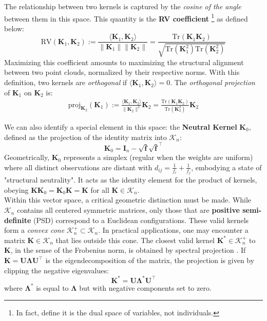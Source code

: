 \documentclass[11pt]{article}
\begin{document}
	The relationship between two kernels is captured by the \emph{cosine of the angle} between them in this space. This quantity is the \textbf{RV coefficient} \citep{robert_unifying_1976}\footnote{In fact,  \citep{robert_unifying_1976} define it is the dual space of variables, not individuals.} as defined below:
	\begin{equation} \label{rv_coeff}
		\text{RV}(\mathbf{K}_1, \mathbf{K}_2) := \frac{\langle \mathbf{K}_1, \mathbf{K}_2 \rangle}{\| \mathbf{K}_1 \| \| \mathbf{K}_2 \|} = \frac{\text{Tr}(\mathbf{K}_1 \mathbf{K}_2)}{\sqrt{\text{Tr}(\mathbf{K}_1^2)\text{Tr}(\mathbf{K}_2^2)}}
	\end{equation}
	Maximizing this coefficient amounts to maximizing the structural alignment between two point clouds, normalized by their respective norms.
	With this definition, two kernels are \emph{orthogonal} if $\langle \mathbf{K}_1, \mathbf{K}_2 \rangle = 0$. The \emph{orthogonal projection} of $\mathbf{K}_1$ on $\mathbf{K}_2$ is:
	\begin{align}
		\text{proj}_{\mathbf{K}_2} (\mathbf{K}_1) := \frac{\langle \mathbf{K}_1, \mathbf{K}_2 \rangle}{\| \mathbf{K}_2 \|^2} \mathbf{K}_2 = \frac{\text{Tr}(\mathbf{K}_1 \mathbf{K}_2)}{\text{Tr}(\mathbf{K}_2^2)} \mathbf{K}_2
	\end{align}
	
	We can also identify a special element in this space: the \textbf{Neutral Kernel} $\mathbf{K}_0$, defined as the projection of the identity matrix into $\mathcal{K}_n$:
	\begin{equation}
		\mathbf{K}_0 = \mathbf{I}_n - \sqrt{\mathbf{f}}\sqrt{\mathbf{f}}^\top
	\end{equation}
	Geometrically, $\mathbf{K}_0$ represents a simplex (regular when the weights are uniform) where all distinct observations are distant with $d_{ij} = \tfrac{1}{f_i} +  \tfrac{1}{f_j}$, embodying a state of "structural neutrality". It acts as the identity element for the product of kernels, obeying $\mathbf{K} \mathbf{K}_0 = \mathbf{K}_0 \mathbf{K} = \mathbf{K}$ for all $\mathbf{K} \in \mathcal{K}_n$. \\
	
	Within this vector space, a critical geometric distinction must be made. While $\mathcal{K}_n$ contains all centered symmetric matrices, only those that are \textbf{positive semi-definite} (PSD) correspond to a Euclidean configurations. These valid kernels form a \emph{convex cone} $\mathcal{K}_n^+ \subset \mathcal{K}_n$.  In practical applications, one may encounter a matrix $\mathbf{K} \in \mathcal{K}_n$ that lies outside this cone. The closest valid kernel $\mathbf{K}^* \in \mathcal{K}_n^+$ to $\mathbf{K}$, in the sense of the Frobenius norm, is obtained by spectral projection \citep{higham_computing_1988}. If $\mathbf{K} = \mathbf{U} \bm{\Lambda} \mathbf{U}^\top$ is the eigendecomposition of the matrix, the projection is given by clipping the negative eigenvalues:
	\begin{equation} \label{eq:psd_projection}
		\mathbf{K}^* = \mathbf{U} \bm{\Lambda}^* \mathbf{U}^\top
	\end{equation}
	where $\bm{\Lambda}^*$ is equal to $\bm{\Lambda}$ but with negative components set to zero. \\
	
\end{document}
